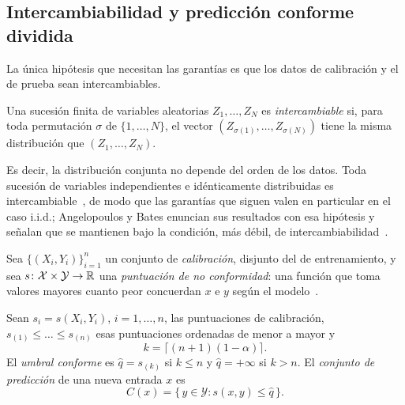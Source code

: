 \subsection{Intercambiabilidad y predicción conforme dividida}\label{sec:conforme-dividida}

La única hipótesis que necesitan las garantías es que los datos de calibración y
el de prueba sean intercambiables.

\begin{definicion}\label{def:intercambiabilidad}
Una sucesión finita de variables aleatorias $Z_1,\dots,Z_N$ es
\emph{intercambiable} si, para toda permutación $\sigma$ de $\{1,\dots,N\}$, el
vector $(Z_{\sigma(1)},\dots,Z_{\sigma(N)})$ tiene la misma distribución que
$(Z_1,\dots,Z_N)$.
\end{definicion}

Es decir, la distribución conjunta no depende del orden de los datos. Toda
sucesión de variables independientes e idénticamente distribuidas es
intercambiable~\cite{vovk2022}, de modo que las garantías que siguen valen en
particular en el caso i.i.d.; Angelopoulos y Bates enuncian sus resultados con esa
hipótesis y señalan que se mantienen bajo la condición, más débil, de
intercambiabilidad~\cite{angelopoulos2021}.

Sea $\{(X_i,Y_i)\}_{i=1}^{n}$ un conjunto de \emph{calibración}, disjunto del de
entrenamiento, y sea $s\colon\mathcal{X}\times\mathcal{Y}\to\mathbb{R}$ una
\emph{puntuación de no conformidad}: una función que toma valores mayores cuanto
peor concuerdan $x$ e $y$ según el modelo~\cite{angelopoulos2021,vovk2022}.

\begin{definicion}\label{def:split-conformal}
Sean $s_i = s(X_i,Y_i)$, $i = 1,\dots,n$, las puntuaciones de calibración,
$s_{(1)} \le \dots \le s_{(n)}$ esas puntuaciones ordenadas de menor a mayor y
\[
  k = \bigl\lceil (n+1)(1-\alpha) \bigr\rceil .
\]
El \emph{umbral conforme} es $\hat q = s_{(k)}$ si $k \le n$ y $\hat q = +\infty$
si $k > n$. El \emph{conjunto de predicción} de una nueva entrada $x$ es
\[
  C(x) = \bigl\{\, y \in \mathcal{Y} : s(x,y) \le \hat q \,\bigr\}.
\]
\end{definicion}

